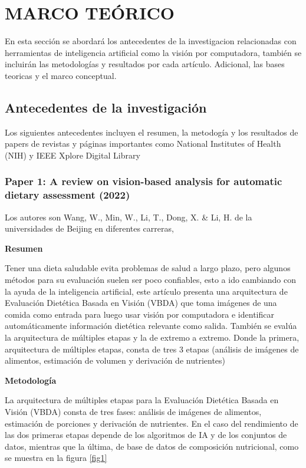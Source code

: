 \chapter{MARCO TEÓRICO}

En esta sección se abordará los antecedentes de la investigacion relacionadas con herramientas de inteligencia artificial como la visión por computadora, también se incluirán las metodologías y resultados por cada artículo. Adicional, las bases teoricas y el marco conceptual. 


\section{Antecedentes de la investigación}

Los siguientes antecedentes incluyen el resumen, la metodogía y los resultados de papers de revistas y páginas importantes como National Institutes of Health (NIH) y IEEE Xplore Digital Library 

\subsection{Paper 1: A review on vision-based analysis for automatic dietary assessment (2022)}

Los autores son Wang, W., Min, W., Li, T., Dong, X. \& Li, H. de la universidades de Beijing en diferentes carreras, \parencite{wang2022review}

\textbf{Resumen}

\thinspace
Tener una dieta saludable evita problemas de salud a largo plazo, pero algunos métodos para su evaluación suelen ser poco confiables, esto a ido cambiando con la ayuda de la inteligencia artificial, este artículo presenta una arquitectura de Evaluación Dietética Basada en Visión (VBDA) que toma imágenes de una comida como entrada para luego usar visión por computadora e identificar automáticamente información dietética relevante como salida. También se evalúa la arquitectura de múltiples etapas y la de extremo a extremo. Donde la primera, arquitectura de múltiples etapas, consta de tres 3 etapas (análisis de imágenes de alimentos, estimación de volumen y derivación de nutrientes)

\textbf{Metodología}

\thinspace
La arquitectura de múltiples etapas para la Evaluación Dietética Basada en Visión (VBDA) consta de tres fases: análisis de imágenes de alimentos, estimación de porciones y derivación de nutrientes. En el caso del rendimiento de las dos primeras etapas depende de los algoritmos de IA y de los conjuntos de datos, mientras que la última, de base de datos de composición nutricional, como se muestra en la figura \ref{fig1}


